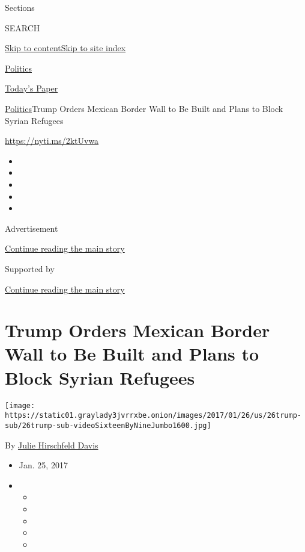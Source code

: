 Sections

SEARCH

\protect\hyperlink{site-content}{Skip to
content}\protect\hyperlink{site-index}{Skip to site index}

\href{https://www.nytimes3xbfgragh.onion/section/politics}{Politics}

\href{https://myaccount.nytimes3xbfgragh.onion/auth/login?response_type=cookie\&client_id=vi}{}

\href{https://www.nytimes3xbfgragh.onion/section/todayspaper}{Today's
Paper}

\href{/section/politics}{Politics}\textbar{}Trump Orders Mexican Border
Wall to Be Built and Plans to Block Syrian Refugees

\url{https://nyti.ms/2ktUvwa}

\begin{itemize}
\item
\item
\item
\item
\item
\end{itemize}

Advertisement

\protect\hyperlink{after-top}{Continue reading the main story}

Supported by

\protect\hyperlink{after-sponsor}{Continue reading the main story}

\hypertarget{trump-orders-mexican-border-wall-to-be-built-and-plans-to-block-syrian-refugees}{%
\section{Trump Orders Mexican Border Wall to Be Built and Plans to Block
Syrian
Refugees}\label{trump-orders-mexican-border-wall-to-be-built-and-plans-to-block-syrian-refugees}}

\texttt{[image: https://static01.graylady3jvrrxbe.onion/images/2017/01/26/us/26trump-sub/26trump-sub-videoSixteenByNineJumbo1600.jpg]}

By
\href{https://www.nytimes3xbfgragh.onion/by/julie-hirschfeld-davis}{Julie
Hirschfeld Davis}

\begin{itemize}
\item
  Jan. 25, 2017
\item
  \begin{itemize}
  \item
  \item
  \item
  \item
  \item
  \end{itemize}
\end{itemize}

